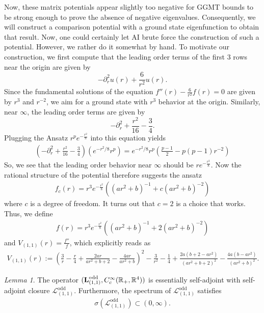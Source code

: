 \documentclass[11pt,reqno]{amsart}
\theoremstyle{remark}
\newtheorem{lem}{Lemma}[section]
\newcommand{\R}{\mathbb{R}}
\newcommand{\Lf}{\textup{\textbf{L}}}
\theoremstyle{definition}
\begin{document}
Now, these matrix potentials appear slightly too negative for GGMT bounds to be strong enough to prove the absence of negative eigenvalues. Consequently, we will construct a comparison potential with a ground state eigenfunction to obtain that result. Now, one could certainly let AI brute force the construction of such a potential. However, we rather do it somewhat by hand. To motivate our construction, we first compute that the leading order terms of the first 3 rows near the origin are given by 
$$
-\partial_r^2 u(r) +\frac{6}{r^2} u(r).
$$
Since the fundamental solutions of the equation $f''(r)-\frac{6}{r^2}f(r)=0$ are given by $r^3$ and $r^{-2}$, we aim for a ground state with $r^3$ behavior at the origin. Similarly, near $\infty$, the leading order terms are given by 
\[
-\partial_r^2 +\frac{r^2}{16}-\frac34.
\]
Plugging the Ansatz $ r^p e^{-\frac{r^2}{8}}$ into this equation yields  
\begin{align*}
\left(
-\partial_r^2+\frac{r^2}{16}-\frac34
\right)\left(e^{-r^2/8}r^p\right)
=
e^{-r^2/8}r^p\left(
\frac{p-1}{2}-
p(p-1)r^{-2}
\right)
\end{align*}
So, we see that the leading order behavior near $\infty$ should be $r e^{-\frac{r^2}{8}}$. Now the rational structure of the potential therefore suggests the ansatz
\begin{align*}
f_c(r)= r^3e^{-\frac{r^2}{8}}\left((ar^2+b)^{-1}+c( ar^2+b)^{-2}\right)
\end{align*}
where $c$ is a degree of freedom. It turns out that $c=2$ is a choice that works. Thus, 
we define 
\begin{align*}
f(r)= r^3e^{-\frac{r^2}{8}}((ar^2+b)^{-1}+2( ar^2+b)^{-2})
\end{align*}
and $V_{(1,1)}(r)=\frac{f''}{f}$, which explicitly  reads as 
\begin{align*}
V_{(1,1)}(r):=\left(
\frac{3}{r}-\frac{r}{4}
+\frac{2ar}{ar^2+b+2}
-\frac{4ar}{ar^2+b}
\right)^2
-\frac{3}{r^2}-\frac14
+\frac{2a(b+2-ar^2)}{(ar^2+b+2)^2}
-\frac{4a(b-ar^2)}{(ar^2+b)^2}.
\end{align*}
\begin{lem}
The operator $(\Lf_{(1,1)}^{\mathrm{odd}},C^\infty_{c}(\R_+,\R^4))$ is essentially self-adjoint with self-adjoint closure $\mathcal{L}_{(1,1)}^{\mathrm{odd}}$.
Furthermore, the spectrum of $\mathcal{L}_{(1,1)}^{\mathrm{odd}}$ satisfies
\begin{align*}
\sigma(\mathcal{L}_{(1,1)}^{\mathrm{odd}})\subset (0,\infty).
\end{align*}
\end{lem}
\end{document}
